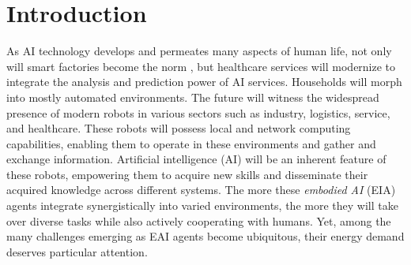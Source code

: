 \documentclass[12pt]{article}
\renewcommand{\emph}[1]{\textit{#1}}
\begin{document}

\newcommand{\beginsupplement}
{%
	\setcounter{table}{0}
	\renewcommand{\thesection}{S\arabic{section}}
	\renewcommand{\thetable}{S\arabic{table}}%
	\setcounter{figure}{0}
	\renewcommand{\thefigure}{S\arabic{figure}}%
}


\section*{Introduction}\label{sec:intro}
As AI technology develops and permeates many aspects of human life, not only will smart factories become the norm \cite{Szczepanski2019Economicimpactsartificial}, but healthcare services will modernize to integrate the analysis and prediction power of AI services. Households will morph into mostly automated environments. The future will witness the widespread presence of modern robots in various sectors such as industry, logistics, service, and healthcare. These robots will possess local and network computing capabilities, enabling them to operate in these environments and gather and exchange information. Artificial intelligence (AI) will be an inherent feature of these robots, empowering them to acquire new skills and disseminate their acquired knowledge across different systems. The more these \emph{embodied AI} (EIA) agents integrate synergistically into varied environments, the more they will take over diverse tasks while also actively cooperating with humans. Yet, among the many challenges emerging as EAI agents become ubiquitous, their energy demand deserves particular attention.
\end{document}
